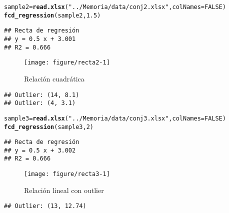\documentclass[12pt]{report}\usepackage[]{graphicx}\usepackage[dvipsnames]{xcolor}
\makeatletter
\def\maxwidth{ %
  \ifdim\Gin@nat@width>\linewidth
    \linewidth
  \else
    \Gin@nat@width
  \fi
}
\newcommand{\hlnum}[1]{\textcolor[rgb]{0.686,0.059,0.569}{#1}}%
\newcommand{\hlstr}[1]{\textcolor[rgb]{0.192,0.494,0.8}{#1}}%
\newcommand{\hlstd}[1]{\textcolor[rgb]{0.345,0.345,0.345}{#1}}%
\newcommand{\hlkwb}[1]{\textcolor[rgb]{0.69,0.353,0.396}{#1}}%
\newcommand{\hlkwc}[1]{\textcolor[rgb]{0.333,0.667,0.333}{#1}}%
\newcommand{\hlkwd}[1]{\textcolor[rgb]{0.737,0.353,0.396}{\textbf{#1}}}%
\newenvironment{kframe}{%
 \def\at@end@of@kframe{}%
 \ifinner\ifhmode%
  \def\at@end@of@kframe{\end{minipage}}%
  \begin{minipage}{\columnwidth}%
 \fi\fi%
 \def\FrameCommand##1{\hskip\@totalleftmargin \hskip-\fboxsep
 \colorbox{shadecolor}{##1}\hskip-\fboxsep
     \hskip-\linewidth \hskip-\@totalleftmargin \hskip\columnwidth}%
 \MakeFramed {\advance\hsize-\width
   \@totalleftmargin\z@ \linewidth\hsize
   \@setminipage}}%
 {\par\unskip\endMakeFramed%
 \at@end@of@kframe}
\newenvironment{knitrout}{}{} %
\makeatother
\begin{document}
\begin{knitrout}
\color{fgcolor}\begin{kframe}
\begin{alltt}
\hlstd{sample2} \hlkwb{=} \hlkwd{read.xlsx}\hlstd{(}\hlstr{"../Memoria/data/conj2.xlsx"}\hlstd{,} \hlkwc{colNames}\hlstd{=}\hlnum{FALSE}\hlstd{)}
\hlkwd{fcd_regression}\hlstd{(sample2,} \hlnum{1.5}\hlstd{)}
\end{alltt}
\begin{verbatim}
## Recta de regresión
## y = 0.5 x + 3.001 
## R2 = 0.666
\end{verbatim}
\end{kframe}\begin{figure}[H]

{\centering \texttt{[image: figure/recta2-1]} 

}

\caption[Relación cuadrática]{Relación cuadrática}\label{fig:recta2}
\end{figure}

\begin{kframe}\begin{verbatim}
## Outlier: (14, 8.1)
## Outlier: (4, 3.1)
\end{verbatim}
\end{kframe}
\end{knitrout}
 				
\begin{knitrout}
\color{fgcolor}\begin{kframe}
\begin{alltt}
\hlstd{sample3} \hlkwb{=} \hlkwd{read.xlsx}\hlstd{(}\hlstr{"../Memoria/data/conj3.xlsx"}\hlstd{,} \hlkwc{colNames}\hlstd{=}\hlnum{FALSE}\hlstd{)}
\hlkwd{fcd_regression}\hlstd{(sample3,} \hlnum{2}\hlstd{)}
\end{alltt}
\begin{verbatim}
## Recta de regresión
## y = 0.5 x + 3.002 
## R2 = 0.666
\end{verbatim}
\end{kframe}\begin{figure}[H]

{\centering \texttt{[image: figure/recta3-1]} 

}

\caption[Relación lineal con outlier]{Relación lineal con outlier}\label{fig:recta3}
\end{figure}

\begin{kframe}\begin{verbatim}
## Outlier: (13, 12.74)
\end{verbatim}
\end{kframe}
\end{knitrout}
 				
\end{document}
